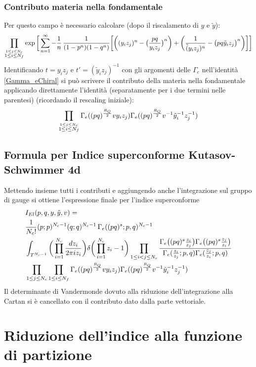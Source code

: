 \documentclass[a4paper,12pt]{report}
\begin{document}
\subsubsection{Contributo materia nella fondamentale}
Per questo campo è necessario calcolare (dopo il riscalamento di $y$ e $\tilde y$):
\begin{align*}
\prod_{\overset{ 1 \leq j \leq N_c}{ 1 \leq i \leq N_f}} \exp \bigg[ \sum_{n=1}^{\infty} - {1 \over n} \, {1 \over (1-p^n)( 1-q^n)}
\bigg[ \bigg( (y_i z_j)^n - \big({ pq \over y_i z_j}\big)^n \bigg) + \bigg( {1 \over \tilde  (y_i z_j)^n } - \big( { pq \tilde y_i z_j} \big)^n\bigg) \bigg] \bigg]
\end{align*}
Identificando $ t = y_i z_j$ e $ t' = (\tilde y_i z_j)^{-1}$ con gli argomenti delle $\Gamma_e$ nell'identità \ref{Gamma_eChiral} si può scrivere il contributo della materia nella fondamentale applicando direttamente l'identità (separatamente per i due termini nelle parentesi) (ricordando il rescaling iniziale):
$$
\prod_{\overset{ 1 \leq j \leq N_c}{ 1 \leq i \leq N_f}} \Gamma_e ( (pq)^{R_Q \over 2} v y_i z_j )
\Gamma_e ( (pq)^{R_Q \over 2} v^{-1} {\tilde y_i}^{-1} z_j^{-1})
$$
\subsection{Formula per Indice superconforme Kutasov-Schwimmer 4d}
Mettendo insieme tutti i contributi e aggiungendo anche l'integrazione sul gruppo di gauge si ottiene l'espressione finale per l'indice superconforme
\begin{align*}
&I_{El} ( p,q,y,\tilde y , v) = \\
 & { 1 \over N_c !} (p;p)^{N_c-1} ( q;q)^{N_c-1} \, \Gamma_e( (pq)^s;p,q)^{N_c-1} \\
&\int_{T^{N_c-1}} \bigg( \prod_{i=1}^{N_c } { d z_i \over { 2 \pi i z_i} } \bigg) \delta \bigg( \prod_{i=1}^{N_c} z_i - 1 \bigg) 
\prod_{ 1 \leq i < j \leq N_c} \frac{ \Gamma_e \big( (pq)^s {z_i \over z_j} \big) \Gamma_e \big( (pq)^s {z_j \over z_i} \big) }{ \Gamma_e( {z_i \over z_j};p,q) \Gamma_e({z_j \over z_i}; p,q)} \\
& \prod_{ 1 \leq j \leq N_c} \prod_{ 1 \leq i \leq N_f} \Gamma_e ( (pq)^{R_Q \over 2} v y_i z_j )
\Gamma_e ( (pq)^{R_Q \over 2} v^{-1} {\tilde y_i}^{-1} z_j^{-1})
\end{align*}
Il determinante di Vandermonde dovuto alla riduzione dell'integrazione alla Cartan si è cancellato con il contributo dato dalla parte vettoriale.
\section{Riduzione dell'indice alla funzione di partizione}
\end{document}
